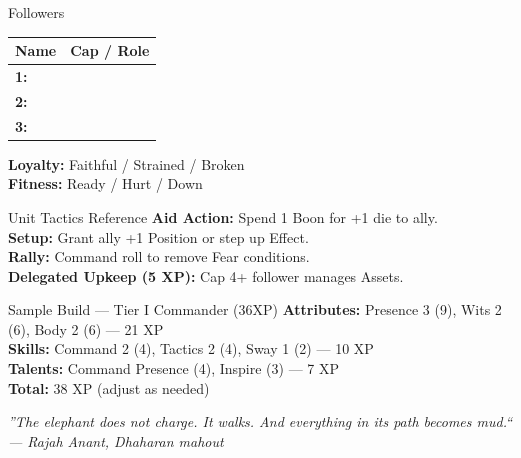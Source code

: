 \documentclass[10pt]{article}
\begin{document}
\begin{minipage}[t]{0.48\linewidth}
    \begin{charbox}{Followers}
        \begin{tabular}{>{\bfseries}p{3cm} p{4.5cm}}
            \toprule
            \textbf{Name} & \textbf{Cap / Role} \\
            \midrule
            1: & \underline{\hspace{4cm}} \\
            2: & \underline{\hspace{4cm}} \\
            3: & \underline{\hspace{4cm}} \\
            \bottomrule
        \end{tabular}
        \textbf{Loyalty:} Faithful / Strained / Broken\\
        \textbf{Fitness:} Ready / Hurt / Down
    \end{charbox}
    
    \vspace{0.5em}
    
    \begin{charbox}{Unit Tactics Reference}
        \textbf{Aid Action:} Spend 1 Boon for +1 die to ally.\\
        \textbf{Setup:} Grant ally +1 Position or step up Effect.\\
        \textbf{Rally:} Command roll to remove Fear conditions.\\
        \textbf{Delegated Upkeep (5 XP):} Cap 4+ follower manages Assets.
    \end{charbox}
    
    \vspace{0.5em}
    
    \begin{charbox}{Sample Build --- Tier I Commander (36XP)}
        \textbf{Attributes:} Presence 3 (9), Wits 2 (6), Body 2 (6) --- 21 XP\\
        \textbf{Skills:} Command 2 (4), Tactics 2 (4), Sway 1 (2) --- 10 XP\\
        \textbf{Talents:} Command Presence (4), Inspire (3) --- 7 XP\\
        \textbf{Total:} 38 XP (adjust as needed)
    \end{charbox}
\end{minipage}

\vspace{0.5em}
\begin{center}
    {\small\sffamily\itshape ''The elephant does not charge. It walks. And everything in its path becomes mud.`` --- Rajah Anant, Dhaharan mahout}
\end{center}
\end{document}
